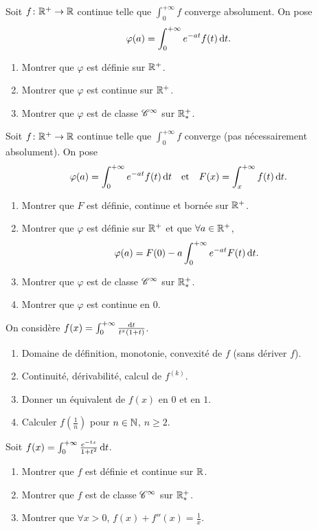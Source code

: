 \documentclass{yann}
\begin{document}
\Exercice

Soit $f\colon\mathbb{R}^+\to\mathbb{R}$ continue telle que
$\int_0^{+\infty} f$ converge absolument.
On pose \[ \varphi(a) = \int_0^{+\infty} e^{-at}f(t) \mathop{}\!\mathrm{d} t. \]
\begin{enumerate}
\item
Montrer que $\varphi$ est définie sur $\mathbb{R}^+$.
\item
Montrer que $\varphi$ est continue sur $\mathbb{R}^+$.
\item
Montrer que $\varphi$ est de classe $\mathscr{C}^{\infty}$ sur $\mathbb{R}^+_*$.
\end{enumerate}


Soit $f\colon\mathbb{R}^+\to\mathbb{R}$ continue telle que
$\int_0^{+\infty} f$ converge (pas nécessairement absolument).
On pose \[ \varphi(a) = \int_0^{+\infty} e^{-at}f(t) \mathop{}\!\mathrm{d} t \quad\text{et}\quad
F(x) = \int_x^{+\infty} f(t) \mathop{}\!\mathrm{d} t. \]
\begin{enumerate}
\item
Montrer que $F$ est définie, continue et bornée sur $\mathbb{R}^+$.
\item
Montrer que $\varphi$ est définie sur $\mathbb{R}^+$ et que $\forall a\in\mathbb{R}^+$,
  \[ \varphi(a) = F(0) - a\int_0^{+\infty} e^{-at} F(t) \mathop{}\!\mathrm{d} t. \]
\item
Montrer que $\varphi$ est de classe $\mathscr{C}^{\infty}$ sur $\mathbb{R}^+_*$.
\item
Montrer que $\varphi$ est continue en $0$.
\end{enumerate}

\Exercice

On considère $f(x) = \int_0^{+\infty} \frac{\mathop{}\!\mathrm{d} t}{t^x (1+t)}$.
\begin{enumerate}
\item
Domaine de définition, monotonie, convexité de $f$ (sans dériver $f$).
\item
Continuité, dérivabilité, calcul de $f^{(k)}$.
\item
Donner un équivalent de $f(x)$ en $0$ et en $1$.
\item
Calculer $f(\frac1n)$ pour $n\in\mathbb{N}$, $n\geq2$.
\end{enumerate}

\Exercice

Soit $f(x) = \int_0^{+\infty} \frac{e^{-tx}}{1+t^2} \mathop{}\!\mathrm{d} t$.
\begin{enumerate}
\item
Montrer que $f$ est définie et continue sur $\mathbb{R}$.
\item
Montrer que $f$ est de classe $\mathscr{C}^{\infty}$ sur $\mathbb{R}^+_*$.
\item
Montrer que $\forall x > 0$, $f(x) + f''(x) = \frac{1}{x}$.
\end{enumerate}
\end{document}
